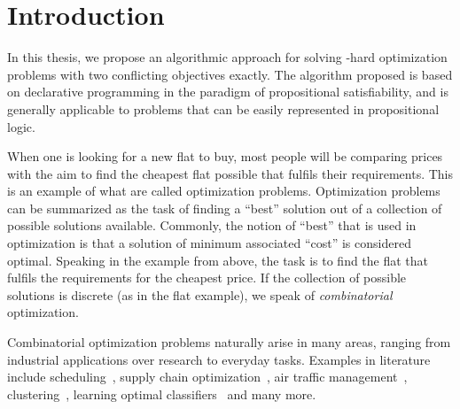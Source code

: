\chapter{Introduction\label{chap:intro}}

In this thesis, we propose an algorithmic approach for solving \NP-hard optimization problems with two conflicting objectives exactly.
The algorithm proposed is based on declarative programming in the paradigm of propositional satisfiability, and is generally applicable to problems that can be easily represented in propositional logic.

When one is looking for a new flat to buy, most people will be comparing prices with the aim to find the cheapest flat possible that fulfils their requirements.
This is an example of what are called optimization problems.
Optimization problems can be summarized as the task of finding a ``best'' solution out of a collection of possible solutions available.
Commonly, the notion of ``best'' that is used in optimization is that a solution of minimum associated ``cost'' is considered optimal.
Speaking in the example from above, the task is to find the flat that fulfils the requirements for the cheapest price.
If the collection of possible solutions is discrete (as in the flat example), we speak of \emph{combinatorial} optimization.

Combinatorial optimization problems naturally arise in many areas, ranging from industrial applications over research to everyday tasks.
Examples in literature include scheduling~\autocites{DBLP:conf/cp/Stojadinovic14,DBLP:conf/cpaior/BofillGSV15,DBLP:journals/ior/Solomon87,DBLP:journals/candie/AkyolB07}, supply chain optimization~\autocite{}, air traffic management~\autocites{DBLP:journals/ior/BertsimasLO11,RichardsHow2002Aircrafttrajectoryplanning}, clustering~\autocite{DBLP:journals/ai/DaoDV17,DBLP:conf/sdm/DavidsonRS10}, learning optimal classifiers~\autocites{DBLP:conf/cp/MaliotovM18,DBLP:conf/ijcai/NarodytskaIPM18,DBLP:conf/ijcai/Hu0HH20,DBLP:conf/cp/YuISB20,DBLP:conf/aaai/DemirovicS21,DBLP:conf/cp/ShatiCM21} and many more.

